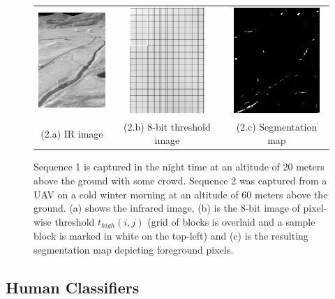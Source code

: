 \documentclass[runningheads]{llncs}
\begin{document}
\begin{figure}
  \begin{tabular}{ccc}
    \includegraphics[height=4cm]{img/eps/bg_sub/Roth_Infrared_Image_screenshot.eps} &
    \includegraphics[height=4cm]{img/eps/bg_sub/Roth_Threshold_values_high_screenshot.eps} &
    \includegraphics[height=4cm]{img/eps/bg_sub/Roth_Segmentation_Map_screenshot.eps} \\
    \small (2.a) IR image & 
    \small (2.b) 8-bit threshold image &
    \small (2.c) Segmentation map
  \end{tabular}

  \caption{Sequence 1 is captured in the night time at an altitude of 20 meters above the ground with some crowd. Sequence 2 was captured from a UAV on a cold winter morning at an altitude of 60 meters above the ground. (a) shows the infrared image, (b) is the 8-bit image of pixel-wise threshold $t_{high}(i, j)$  (grid of blocks is overlaid and a sample block is marked in white on the top-left) and (c) is the resulting segmentation map depicting foreground pixels.}\label{fig:bg_sub}
\end{figure}


\subsection{Human Classifiers}
\end{document}
